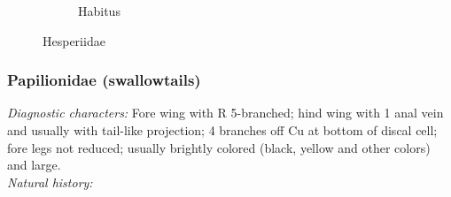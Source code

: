 \documentclass[letterpaper, 11pt]{article}
\begin{document}
\begin{figure}[ht!]
\begin{subfigure}[ht!]{0.5\textwidth}
        \caption{Habitus}
        \label{fig:hesperiid2}
    \end{subfigure}
    \caption{Hesperiidae}\label{fig:hesperiids}
\end{figure}

\subsubsection{Papilionidae (swallowtails)}
\noindent{}\textit{Diagnostic characters:} Fore wing with R 5-branched; hind wing with 1 anal vein and usually with tail-like projection; 4 branches off Cu at bottom of discal cell; fore legs not reduced; usually brightly colored (black, yellow and other colors) and large.\\

\noindent{}\textit{Natural history:} 
\end{document}
